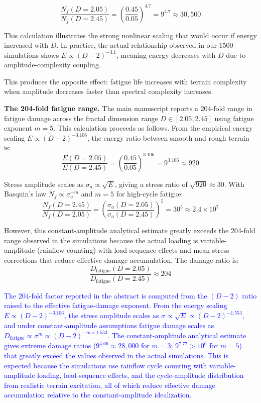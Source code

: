 \documentclass[11pt]{article}
\begin{document}
\begin{equation}
\frac{N_f(D=2.05)}{N_f(D=2.45)} = \left(\frac{0.45}{0.05}\right)^{4.7} = 9^{4.7} \approx 30{,}500
\end{equation}

This calculation illustrates the strong nonlinear scaling that would occur if energy increased with $D$. In practice, the actual relationship observed in our 1500 simulations shows $E \propto (D-2)^{-3.1}$, meaning energy decreases with $D$ due to amplitude-complexity coupling. 

This produces the opposite effect: fatigue life increases with terrain complexity when amplitude decreases faster than spectral complexity increases.

\textbf{The 204-fold fatigue range.} The main manuscript reports a 204-fold range in fatigue damage across the fractal dimension range $D \in [2.05, 2.45]$ using fatigue exponent $m = 5$. This calculation proceeds as follows. From the empirical energy scaling $E \propto (D-2)^{-3.106}$, the energy ratio between smooth and rough terrain is:
\begin{equation}
\frac{E(D=2.05)}{E(D=2.45)} = \left(\frac{0.45}{0.05}\right)^{3.106} = 9^{3.106} \approx 920
\end{equation}

Stress amplitude scales as $\sigma_a \propto \sqrt{E}$, giving a stress ratio of $\sqrt{920} \approx 30$. With Basquin's law $N_f \propto \sigma_a^{-m}$ and $m = 5$ for high-cycle fatigue:
\begin{equation}
\frac{N_f(D=2.45)}{N_f(D=2.05)} = \left(\frac{\sigma_a(D=2.05)}{\sigma_a(D=2.45)}\right)^5 = 30^5 \approx 2.4 \times 10^7
\end{equation}

However, this constant-amplitude analytical estimate greatly exceeds the 204-fold range observed in the simulations because the actual loading is variable-amplitude (rainflow counting) with load-sequence effects and mean-stress corrections that reduce effective damage accumulation. The damage ratio is:
\begin{equation}
\frac{D_{\text{fatigue}}(D=2.05)}{D_{\text{fatigue}}(D=2.45)} \approx 204
\end{equation}

\textcolor{blue}{The 204-fold factor reported in the abstract is computed from the $(D-2)$ ratio raised to the effective fatigue-damage exponent. From the energy scaling $E \propto (D-2)^{-3.106}$, the stress amplitude scales as $\sigma \propto \sqrt{E} \propto (D-2)^{-1.553}$, and under constant-amplitude assumptions fatigue damage scales as $D_{\text{fatigue}} \propto \sigma^m \propto (D-2)^{-m \times 1.553}$. The constant-amplitude analytical estimate gives extreme damage ratios ($9^{4.66} \approx 28{,}000$ for $m = 3$; $9^{7.77} > 10^6$ for $m = 5$) that greatly exceed the values observed in the actual simulations. This is expected because the simulations use rainflow cycle counting with variable-amplitude loading, load-sequence effects, and the cycle-amplitude distribution from realistic terrain excitation, all of which reduce effective damage accumulation relative to the constant-amplitude idealization.}
\end{document}
